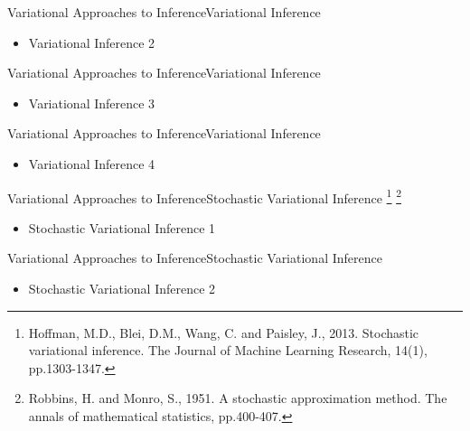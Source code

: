 \documentclass[AERbeamer%
              ,optEnglish%
              ,optBiber%
              ,optBibstyleAlphabetic%
              ,optBeamerClassicFormat%
              ]{AERlatex}%
\begin{document}
\begin{frame}[c]{Variational Approaches to Inference}{Variational Inference}
    \centering
    \begin{itemize}
        \item Variational Inference 2
    \end{itemize}
\end{frame}


\begin{frame}[c]{Variational Approaches to Inference}{Variational Inference}
    \centering
    \begin{itemize}
        \item Variational Inference 3
    \end{itemize}
\end{frame}


\begin{frame}[c]{Variational Approaches to Inference}{Variational Inference}
    \centering
    \begin{itemize}
        \item Variational Inference 4
    \end{itemize}
\end{frame}



\begin{frame}[c]{Variational Approaches to Inference}{Stochastic Variational Inference \footnote{Hoffman, M.D., Blei, D.M., Wang, C. and Paisley, J., 2013. Stochastic variational
                                                                                                 inference. The Journal of Machine Learning Research, 14(1), pp.1303-1347.}
                                                                                       \footnote{Robbins, H. and Monro, S., 1951. A stochastic approximation method. The annals of 
                                                                                                 mathematical statistics, pp.400-407.}}
    \centering
    \begin{itemize}
        \item Stochastic Variational Inference 1
    \end{itemize}
\end{frame}


\begin{frame}[c]{Variational Approaches to Inference}{Stochastic Variational Inference}
    \centering
    \begin{itemize}
        \item Stochastic Variational Inference 2
    \end{itemize}
\end{frame}
\end{document}
